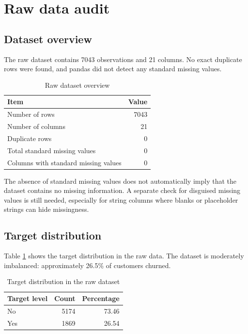 \section{Raw data audit}

\subsection{Dataset overview}

The raw dataset contains 7043 observations and 21 columns. No exact duplicate rows were found, and pandas did not detect any standard missing values.

\begin{table}[H]
\centering
\caption{Raw dataset overview}
\begin{tabular}{lr}
\toprule
Item & Value \\
\midrule
Number of rows & 7043 \\
Number of columns & 21 \\
Duplicate rows & 0 \\
Total standard missing values & 0 \\
Columns with standard missing values & 0 \\
\bottomrule
\end{tabular}
\end{table}

The absence of standard missing values does not automatically imply that the dataset contains no missing information. A separate check for disguised missing values is still needed, especially for string columns where blanks or placeholder strings can hide missingness.

\subsection{Target distribution}

Table \ref{tab:target-distribution} shows the target distribution in the raw data. The dataset is moderately imbalanced: approximately 26.5\% of customers churned.

\begin{table}[H]
\centering
\caption{Target distribution in the raw dataset}
\label{tab:target-distribution}
\begin{tabular}{lrr}
\toprule
Target level & Count & Percentage \\
\midrule
No & 5174 & 73.46 \\
Yes & 1869 & 26.54 \\
\bottomrule
\end{tabular}
\end{table}

